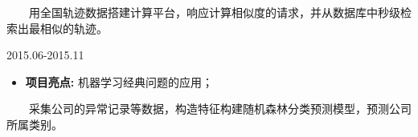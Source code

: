 \documentclass{resume}
\begin{document}
{{ \ \ \ \ 用全国轨迹数据搭建计算平台，响应计算相似度的请求，并从数据库中秒级检索出最相似的轨迹。
}

\medskip










              {2015.06-2015.11}

\begin{itemize} [parsep=0.5ex]

  \item   \textbf{ 项目亮点: }  { 机器学习经典问题的应用； }
  
\end{itemize}

{\ \ \ \ 采集公司的异常记录等数据，构造特征构建随机森林分类预测模型，预测公司所属类别。}
  
\medskip












  



  

















}
\end{document}
